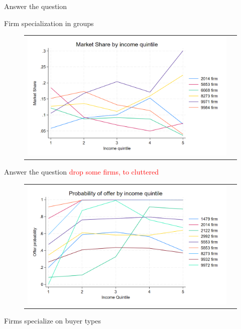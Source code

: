 \documentclass[notes, 10pt,aspectratio=169]{beamer}
\begin{document}





\begin{frame}{Answer the question}\label{slide:fig1}    

Firm specialization in groups
\begin{figure}[H]
\centering{}%
\begin{tabular}{cc}
\includegraphics[scale=0.27]{../figures/IE3_supply_income_quintile.png}
\end{tabular}
\end{figure}
\end{frame}


\begin{frame}{Answer the question}\label{slide:fig2}    
\textcolor{red}{drop some firms, to cluttered}

\begin{figure}[H]
\caption{}
\centering{}%
\begin{tabular}{cc}
\includegraphics[scale=0.24]{../figures/IE3_supply_offerprob_income_q(2).png}
\end{tabular}
\end{figure}

Firms specialize on buyer types
\end{frame}

 
\end{document}
